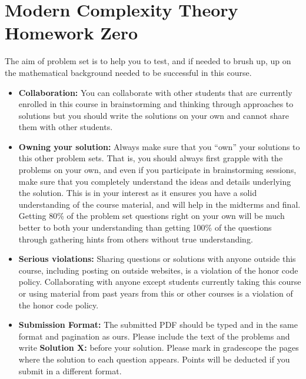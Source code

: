 \documentclass[11pt]{article}
\begin{document}
\section*{Modern Complexity Theory Homework Zero}\label{homework-zero}

The aim of problem set is to help you to test, and if needed to brush up, up on the mathematical
background needed to be successful in this course. 

\begin{itemize}
    \item
        {\bf Collaboration:} You can collaborate with other students that are currently enrolled in
        this course  in brainstorming and thinking through approaches to
        solutions but you should write the solutions on your own and cannot
        share them with other students. 
    \item
        {\bf Owning your solution:} Always make sure that you ``own'' your solutions to this other problem
        sets. That is, you should always first grapple with the problems on
        your own, and even if you participate in brainstorming sessions, make
        sure that you completely understand the ideas and details underlying
        the solution. This is in your interest as it ensures you have a solid
        understanding of the course material, and will help in the midterms
        and final. Getting 80\% of the problem
        set questions right on your own will be much better to both your
        understanding than getting 100\% of the questions through
        gathering hints from others without true understanding.
    \item
        {\bf Serious violations:} Sharing questions or solutions with anyone outside this course,
        including posting on outside websites, is a violation of the honor
        code policy. Collaborating with anyone except students currently
        taking this course or using material from past years from this or
        other courses is a violation of the honor code policy.
    \item
        {\bf Submission Format:} The submitted PDF should be typed and in the same format and
        pagination as ours. Please include the text of the problems and write
        \textbf{Solution X:} before your solution. Please mark in gradescope 
        the pages where
        the solution to each question appears. Points will be deducted if you
        submit in a different format.
\end{itemize}
\end{document}
